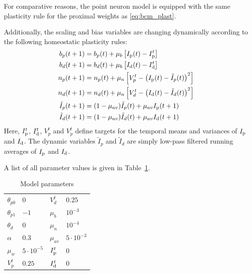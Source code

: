\documentclass[10pt,a4paper,twocolumn]{article}
\begin{document}
		For comparative reasons, the point neuron model is equipped with the
		same plasticity rule for the proximal weights as \eqref{eq:bcm_plast}. 
		
		Additionally, the scaling and bias variables are changing dynamically
		according to the following homeostatic plasticity rules:
		\begin{align}
			b_p(t+1) &= b_p(t) + \mu_b \left[I_{\rm p}(t) - I_{\rm p}^t\right] \\
			b_d(t+1) &= b_d(t) + \mu_b \left[I_{\rm d}(t) - I_{\rm d}^t\right] \\
			n_p(t+1) &= n_p(t) + \mu_n \left[V_p^t - \left( I_{\rm p}(t) - \tilde{I}_p(t)\right)^2\right] \\
			n_d(t+1) &= n_d(t) + \mu_n \left[V_d^t - \left( I_{\rm d}(t) - \tilde{I}_d(t)\right)^2\right] \\
			\tilde{I}_p(t+1) &= (1-\mu_{av})\tilde{I}_p(t) + \mu_{av} I_{\rm p}(t+1) \\
			\tilde{I}_d(t+1) &= (1-\mu_{av})\tilde{I}_d(t) + \mu_{av} I_{\rm d}(t+1)
		\end{align}
		Here, $I_{\rm p}^t$, $I_{\rm d}^t$, $V_p^t$ and $V_p^t$ define targets for the 
		temporal means and variances of $I_{\rm p}$ and $I_{\rm d}$. The dynamic variables 
		$\tilde{I}_p$ and $\tilde{I}_d$ are simply low-pass filtered running 
		averages of $I_{\rm p}$ and $I_{\rm d}$.
		
		A list of all parameter values is given in Table~\ref{tab:parameters}.
		
		\begin{table}
			\begin{tabular}{ l | l || l | l }
				$\theta_{p0}$ & $0$ & $V_d^t$ & $0.25$ \\
				$\theta_{p1}$ & $-1$ & $\mu_b$ & $10^{-3}$ \\ 
				$\theta_{d}$ & $0$ & $\mu_n$ & $10^{-4}$ \\  
				$\alpha$ & $0.3$ & $\mu_{av}$ & $5 \cdot 10^{-3}$ \\   
				$\mu_w$ & $5 \cdot 10^{-5}$ & $I_{\rm p}^t$ & $0$ \\
				$V_p^t$ & $0.25$ & $I_{\rm d}^t$ & $0$  
			\end{tabular}
		\caption{Model parameters}
		\label{tab:parameters}
		\end{table}
		
\end{document}
